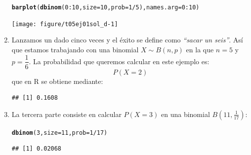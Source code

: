 \documentclass[10pt,a4paper]{article}\usepackage[]{graphicx}\usepackage[]{color}
\makeatletter
\newcommand{\hlnum}[1]{\textcolor[rgb]{0.686,0.059,0.569}{#1}}%
\newcommand{\hlopt}[1]{\textcolor[rgb]{0,0,0}{#1}}%
\newcommand{\hlstd}[1]{\textcolor[rgb]{0.345,0.345,0.345}{#1}}%
\newcommand{\hlkwc}[1]{\textcolor[rgb]{0.333,0.667,0.333}{#1}}%
\newcommand{\hlkwd}[1]{\textcolor[rgb]{0.737,0.353,0.396}{\textbf{#1}}}%
\newenvironment{kframe}{%
 \def\at@end@of@kframe{}%
 \ifinner\ifhmode%
  \def\at@end@of@kframe{\end{minipage}}%
  \begin{minipage}{\columnwidth}%
 \fi\fi%
 \def\FrameCommand##1{\hskip\@totalleftmargin \hskip-\fboxsep
 \colorbox{shadecolor}{##1}\hskip-\fboxsep
     \hskip-\linewidth \hskip-\@totalleftmargin \hskip\columnwidth}%
 \MakeFramed {\advance\hsize-\width
   \@totalleftmargin\z@ \linewidth\hsize
   \@setminipage}}%
 {\par\unskip\endMakeFramed%
 \at@end@of@kframe}
\newenvironment{knitrout}{}{} %
\makeatother
\begin{document}
\begin{enumerate}
\begin{knitrout}
\color{fgcolor}\begin{kframe}
\begin{alltt}
\hlkwd{barplot}\hlstd{(}\hlkwd{dbinom}\hlstd{(}\hlnum{0}\hlopt{:}\hlnum{10}\hlstd{,} \hlkwc{size}\hlstd{=} \hlnum{10}\hlstd{,} \hlkwc{prob}\hlstd{=}\hlnum{1}\hlopt{/}\hlnum{5}\hlstd{),} \hlkwc{names.arg} \hlstd{=} \hlnum{0}\hlopt{:}\hlnum{10}\hlstd{)}
\end{alltt}
\end{kframe}
\texttt{[image: figure/t05ej01sol\_d-1]} 

\end{knitrout}


  \item Lanzamos un dado cinco veces y el éxito se define como {\em ``sacar un seis''}. Así que estamos trabajando con una binomial $X\sim B(n, p)$ en la que $n=5$ y $p=\dfrac{1}{6}$. La probabilidad que queremos calcular en este ejemplo es:
      \[P(X = 2)\]
      que en R se obtiene mediante:
\begin{knitrout}
\color{fgcolor}\begin{kframe}
\begin{verbatim}
## [1] 0.1608
\end{verbatim}
\end{kframe}
\end{knitrout}

  \item La tercera parte consiste en calcular $P(X=3)$ en una binomial $B(11, \frac{1}{17})$:

\begin{knitrout}
\color{fgcolor}\begin{kframe}
\begin{alltt}
\hlkwd{dbinom}\hlstd{(}\hlnum{3}\hlstd{,} \hlkwc{size}\hlstd{=}\hlnum{11}\hlstd{,} \hlkwc{prob}\hlstd{=}\hlnum{1}\hlopt{/}\hlnum{17}\hlstd{)}
\end{alltt}
\begin{verbatim}
## [1] 0.02068
\end{verbatim}
\end{kframe}
\end{knitrout}


\end{enumerate}
\end{document}
